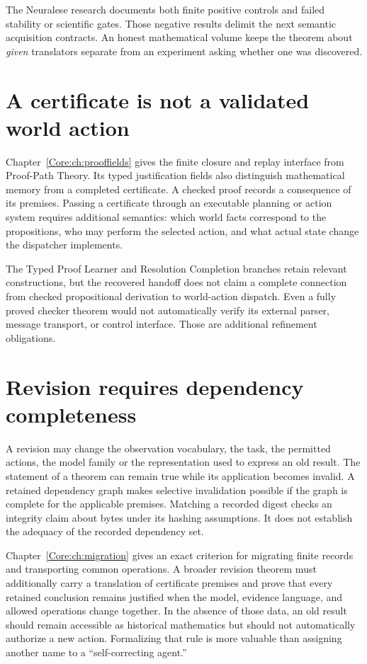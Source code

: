 The Neuralese research documents both finite positive controls and failed stability or scientific gates. Those negative results delimit the next semantic acquisition contracts. An honest mathematical volume keeps the theorem about \emph{given} translators separate from an experiment asking whether one was discovered.

\section{A certificate is not a validated world action}
Chapter~\ref{Core:ch:prooffields} gives the finite closure and replay interface from Proof-Path Theory. Its typed justification fields also distinguish mathematical memory from a completed certificate. A checked proof records a consequence of its premises. Passing a certificate through an executable planning or action system requires additional semantics: which world facts correspond to the propositions, who may perform the selected action, and what actual state change the dispatcher implements.

The Typed Proof Learner and Resolution Completion branches retain relevant constructions, but the recovered handoff does not claim a complete connection from checked propositional derivation to world-action dispatch. Even a fully proved checker theorem would not automatically verify its external parser, message transport, or control interface. Those are additional refinement obligations.

\section{Revision requires dependency completeness}
A revision may change the observation vocabulary, the task, the permitted actions, the model family or the representation used to express an old result. The statement of a theorem can remain true while its application becomes invalid. A retained dependency graph makes selective invalidation possible if the graph is complete for the applicable premises. Matching a recorded digest checks an integrity claim about bytes under its hashing assumptions. It does not establish the adequacy of the recorded dependency set.

Chapter~\ref{Core:ch:migration} gives an exact criterion for migrating finite records and transporting common operations. A broader revision theorem must additionally carry a translation of certificate premises and prove that every retained conclusion remains justified when the model, evidence language, and allowed operations change together. In the absence of those data, an old result should remain accessible as historical mathematics but should not automatically authorize a new action. Formalizing that rule is more valuable than assigning another name to a ``self-correcting agent.''

